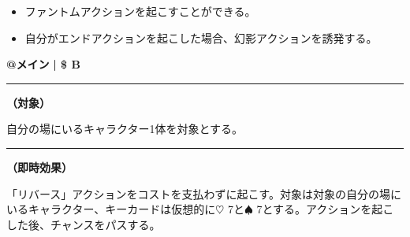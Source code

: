 \documentclass[twocolumn,a5paper,papersize,10pt]{jarticle}
\begin{document}
\vspace{-1zh}%
\begin{itemize}
\setlength{\leftskip}{-0.3cm}
\setlength{\parskip}{0pt} %

\item ファントムアクションを起こすことができる。

\item 自分がエンドアクションを起こした場合、幻影アクションを誘発する。
\vspace{-1zh}%
\end{itemize}

\begin{tcolorbox}[title={\small\bf【Action】ファントム}{\scriptsize （通常魔法）}]

{\scriptsize\bf @メイン }
  {\scriptsize\bf | \$ B }

\vspace{1mm} %
\hrule height 0.1mm depth 0mm width 62mm %
\vspace{1mm} %

{\bf（対象）}

自分の場にいるキャラクター1体を対象とする。

\vspace{1mm} %
\hrule height 0.1mm depth 0mm width 62mm %
\vspace{1mm} %

{\bf（即時効果）}

「リバース」アクションをコストを支払わずに起こす。対象は対象の自分の場にいるキャラクター、キーカードは仮想的に{\normalsize $\heartsuit$} 7と{\normalsize $\spadesuit$} 7とする。アクションを起こした後、チャンスをパスする。

\vspace{1mm} %
\end{tcolorbox}

\vspace{-1zh}

 
 
\end{document}
